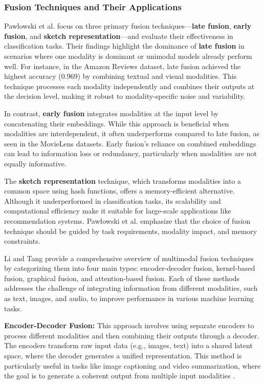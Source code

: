 \subsubsection{Fusion Techniques and Their Applications}

Pawlowski et al. focus on three primary fusion techniques—\textbf{late fusion}, \textbf{early fusion}, and \textbf{sketch representation}—and evaluate their effectiveness in classification tasks. Their findings highlight the dominance of \textbf{late fusion} in scenarios where one modality is dominant or unimodal models already perform well. For instance, in the Amazon Reviews dataset, late fusion achieved the highest accuracy (0.969) by combining textual and visual modalities. This technique processes each modality independently and combines their outputs at the decision level, making it robust to modality-specific noise and variability.
\newline

In contrast, \textbf{early fusion} integrates modalities at the input level by concatenating their embeddings. While this approach is beneficial when modalities are interdependent, it often underperforms compared to late fusion, as seen in the MovieLens datasets. Early fusion's reliance on combined embeddings can lead to information loss or redundancy, particularly when modalities are not equally informative.
\newline

The \textbf{sketch representation} technique, which transforms modalities into a common space using hash functions, offers a memory-efficient alternative. Although it underperformed in classification tasks, its scalability and computational efficiency make it suitable for large-scale applications like recommendation systems. Pawłowski et al. emphasize that the choice of fusion technique should be guided by task requirements, modality impact, and memory constraints.
\newline

Li and Tang provide a comprehensive overview of multimodal fusion techniques by categorizing them into four main types: encoder-decoder fusion, kernel-based fusion, graphical fusion, and attention-based fusion. Each of these methods addresses the challenge of integrating information from different modalities, such as text, images, and audio, to improve performance in various machine learning tasks.
\newline

\textbf{Encoder-Decoder Fusion:} This approach involves using separate encoders to process different modalities and then combining their outputs through a decoder. The encoders transform raw input data (e.g., images, text) into a shared latent space, where the decoder generates a unified representation. This method is particularly useful in tasks like image captioning and video summarization, where the goal is to generate a coherent output from multiple input modalities \citet{8269806}.
\newline


